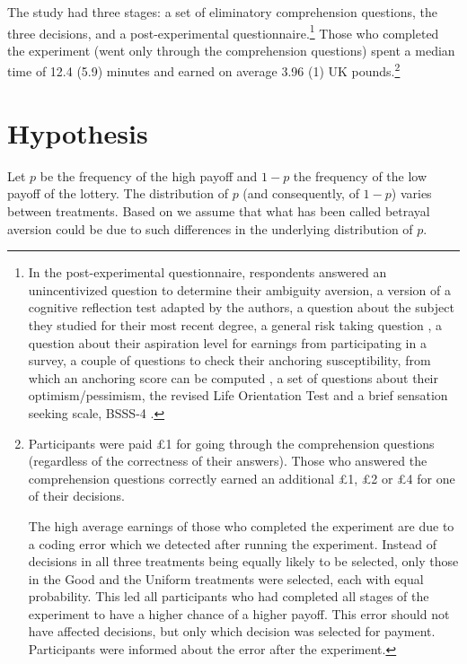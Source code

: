 The study had three stages: a set of eliminatory comprehension questions, the three decisions, and a post-experimental questionnaire.\footnote{
In the post-experimental questionnaire, respondents answered an unincentivized question to determine their ambiguity aversion, a version of a cognitive reflection test \citep{Frederick2005,Thomson2016} adapted by the authors, a question about the subject they studied for their most recent degree, a general risk taking question \citep{Dohmen2011}, a question about their aspiration level for earnings from participating in a survey, a couple of questions to check their anchoring susceptibility, from which an anchoring score can be computed \citep{Cheek2017}, a set of questions about their optimism/pessimism, the revised Life Orientation Test \citep{Scheier1994} and a brief sensation seeking scale, BSSS-4 \citep{Stephenson2003}.
}
Those who completed the experiment (went only through the comprehension questions) spent a median time of 12.4 (5.9) minutes and earned on average 3.96 (1) UK pounds.\footnote{
Participants were paid \pounds1 for going through the comprehension questions (regardless of the correctness of their answers).
Those who answered the comprehension questions correctly earned an additional \pounds1, \pounds2 or \pounds4 for one of their decisions.

The high average earnings of those who completed the experiment are due to a coding error which we detected after running the experiment.
Instead of decisions in all three treatments being equally likely to be selected, only those in the Good and the Uniform treatments were selected, each with equal probability.
This led all participants who had completed all stages of the experiment to have a higher chance of a higher payoff.
This error should not have affected decisions, but only which decision was selected for payment.
Participants were informed about the error after the experiment.
}



\section{Hypothesis}\label{sec:hyp}
Let $p$ be the frequency of the high payoff and $1-p$ the frequency of the low payoff of the lottery.
The distribution of $p$ (and consequently, of $1-p$) varies between treatments.
Based on \cite{Li2020a} we assume that what has been called betrayal aversion could be due to such differences in the underlying distribution of $p$.

